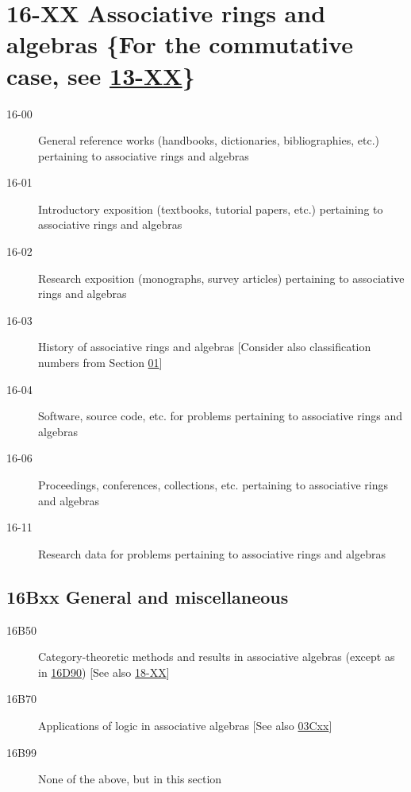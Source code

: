 \documentclass[letterpaper]{article}
\begin{document}
\section*{16-XX Associative rings and algebras \{For the commutative case, see \hyperref[13-XX]{13-XX}\} }\label{16-XX}
\begin{description}
\item [16-00]\label{16-00} General reference works (handbooks, dictionaries, bibliographies, etc.) pertaining to associative rings and algebras
\item [16-01]\label{16-01} Introductory exposition (textbooks, tutorial papers, etc.) pertaining to associative rings and algebras
\item [16-02]\label{16-02} Research exposition (monographs, survey articles) pertaining to associative rings and algebras
\item [16-03]\label{16-03} History of associative rings and algebras [Consider also classification numbers from Section \hyperref[01-XX]{01}]
\item [16-04]\label{16-04} Software, source code, etc. for problems pertaining to associative rings and algebras
\item [16-06]\label{16-06} Proceedings, conferences, collections, etc. pertaining to associative rings and algebras
\item [16-11]\label{16-11} Research data for problems pertaining to associative rings and algebras
\end{description}
\subsection*{16Bxx  General and miscellaneous }\label{16Bxx}
\begin{description}  
\item [16B50]\label{16B50} Category-theoretic methods and results in associative algebras (except as in \hyperref[16D90]{16D90}) [See also \hyperref[18-XX]{18-XX}]
\item [16B70]\label{16B70} Applications of logic in associative algebras [See also \hyperref[03Cxx]{03Cxx}]
\item [16B99]\label{16B99} None of the above, but in this section
\end{description}
\end{document}
